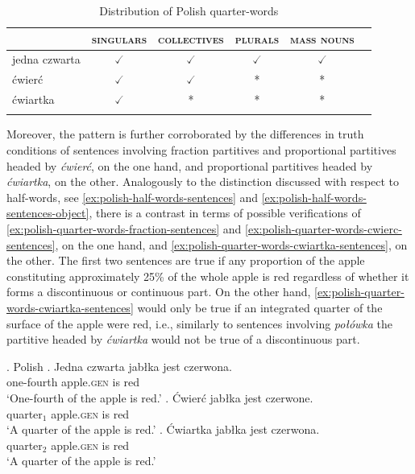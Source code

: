 		\begin{table}[h]
			\centering
			\begin{tabular}{lccccc}
				\lsptoprule
				& \textsc{singulars} & \textsc{collectives} & \textsc{plurals} & \textsc{mass nouns} \\ \midrule
				jedna czwarta     & $\checked$ & $\checked$    & $\checked$ & $\checked$ \\
                ćwierć     & $\checked$ & $\checked$    & * & * \\
				ćwiartka & $\checked$ & * & * & * \\ \lspbottomrule
			\end{tabular}
			\caption{Distribution of Polish quarter-words}\label{tab:distribution-of-polish-quarter-words}
		\end{table}

\begin{sloppypar}
Moreover, the pattern is further corroborated by the differences in truth conditions of sentences involving fraction partitives and proportional partitives headed by \textit{ćwierć}, on the one hand, and proportional partitives headed by \textit{ćwiartka}, on the other. Analogously to the distinction discussed with respect to half-words, see \ref{ex:polish-half-words-sentences} and \ref{ex:polish-half-words-sentences-object}, there is a contrast in terms of possible verifications of \ref{ex:polish-quarter-words-fraction-sentences} and \ref{ex:polish-quarter-words-cwierc-sentences}, on the one hand, and \ref{ex:polish-quarter-words-cwiartka-sentences}, on the other. The first two sentences are true if any proportion of the apple constituting approximately 25\% of the whole apple is red regardless of whether it forms a discontinuous or continuous part. On the other hand, \ref{ex:polish-quarter-words-cwiartka-sentences} would only be true if an integrated quarter of the surface of the apple were red, i.e., similarly to sentences involving \textit{połówka} the partitive headed by \textit{ćwiartka} would not be true of a discontinuous part. 
\end{sloppypar}

\ex. Polish\label{ex:polish-quarter-words-sentences}
\ag. {Jedna czwarta} jabłka jest czerwona.\label{ex:polish-quarter-words-fraction-sentences}\\
one-fourth apple\textsc{.gen} is red\\
`One-fourth of the apple is red.'
\bg. Ćwierć jabłka jest czerwone.\label{ex:polish-quarter-words-cwierc-sentences}\\
quarter$_{1}$ apple\textsc{.gen} is red\\
`A quarter of the apple is red.'
\bg. Ćwiartka jabłka jest czerwona.\label{ex:polish-quarter-words-cwiartka-sentences}\\
quarter$_{2}$ apple\textsc{.gen} is red\\
`A quarter of the apple is red.'

